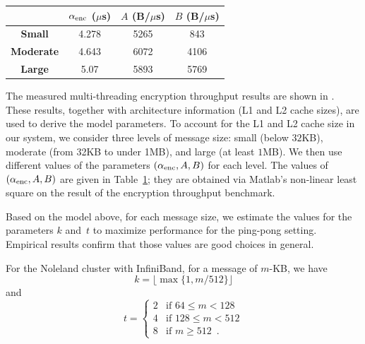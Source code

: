\begin{table}[!t]
		\centering
		\captionsetup{justification=centering, labelsep=newline}
		\begin{tabular}{cccc}
			\toprule[1.25pt]
			\textbf{} &  {$\alpha_{\mathrm{enc}}$ ($\mu$s) } & { $A$ (B/$\mu$s)}  & $B$ (B/$\mu$s) \\ \hline
			\textbf{Small} & 4.278&  5265 & 843 \\ \midrule  
			\textbf{Moderate} & 4.643 &  6072 & 4106 \\    \midrule  
			\textbf{Large} & 5.07 &  5893 & 5769 \\   
			\bottomrule[1.25pt]
		\end{tabular}%
		\label{tab:enc_param} 
	\vspace{-4ex}
\end{table}




The measured multi-threading encryption throughput results are shown
in . These results, together with
architecture information (L1 and L2 cache sizes), are used to derive
the model parameters. To account for the L1 and L2 cache size in our system,
we consider three levels of message size: small (below $32$KB),
moderate (from 32KB to under 1MB), and large (at least $1$MB).
We then use different values of the parameters $(\alpha_{\mathrm{enc}}, A, B)$
for each level.
The values of $(\alpha_{\mathrm{enc}}, A, B)$ are given in Table~\ref{tab:enc_param};
they are obtained via Matlab's non-linear least square on the result of the
encryption throughput benchmark. 

Based on the model above, for each message size, 
we estimate the values for the parameters $k$ and~$t$ to
maximize performance for the ping-pong setting. 
Empirical results confirm that those values
are good choices in general. 

For the Noleland cluster with InfiniBand,
for a message of $m$-KB, we have
\[k = \lfloor \max\{ 1, m / 512\} \rfloor\] and
\[
t =
\begin{cases}
2 & \text{if } 64 \leq m < 128\\
4 & \text{if } 128 \leq m < 512\\
8 & \text{if } m \geq 512 \enspace.
\end{cases}
\]

